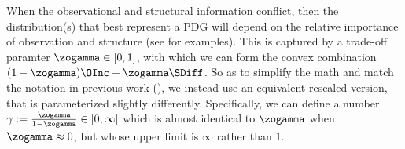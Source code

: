 When the observational and structural information conflict, then the distribution(s)
that best represent a PDG will depend on the relative importance of observation and structure (see  for examples).
%
%
This is captured by a trade-off paramter $\zogamma \in [0,1]$,
with which we can form the convex combination
$(1-\zogamma)\OInc + \zogamma \SDiff$. 
So as to 
simplify the math
and match the notation in
previous work (\citeyear{pdg-aaai,one-true-loss}),
we instead use an equivalent rescaled version, 
that is parameterized slightly differently.
Specifically, we can define 
a number
$\gamma := \frac{\zogamma}{1-\zogamma} \in [0,\infty]$
which is almost identical to $\zogamma$ when $\zogamma \approx 0$, but whose upper limit is $\infty$ rather than 1. 
